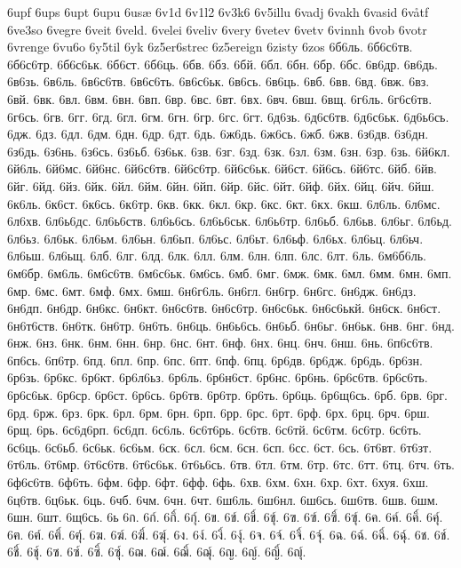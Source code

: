 6upf
6ups
6upt
6upu
6usæ
6v1d
6v1l2
6v3k6
6v5illu
6vadj
6vakh
6vasid
6våtf
6ve3so
6vegre
6veit
6veld.
6velei
6veliv
6very
6vetev
6vetv
6vinnh
6vob
6votr
6vrenge
6vu6o
6y5til
6yk
6z5er6strec
6z5ereign
6zisty
6zos
6б6ль.
6б6с6тв.
6б6с6тр.
6б6с6ьк.
6б6ст.
6б6ць.
6бв.
6бз.
6бй.
6бл.
6бн.
6бр.
6бс.
6в6др.
6в6дь.
6в6зь.
6в6ль.
6в6с6тв.
6в6с6ть.
6в6с6ьк.
6в6сь.
6в6ць.
6вб.
6вв.
6вд.
6вж.
6вз.
6вй.
6вк.
6вл.
6вм.
6вн.
6вп.
6вр.
6вс.
6вт.
6вх.
6вч.
6вш.
6вщ.
6г6ль.
6г6с6тв.
6г6сь.
6гв.
6гг.
6гд.
6гл.
6гм.
6гн.
6гр.
6гс.
6гт.
6д6зь.
6д6с6тв.
6д6с6ьк.
6д6ь6сь.
6дж.
6дз.
6дл.
6дм.
6дн.
6др.
6дт.
6дь.
6ж6дь.
6ж6сь.
6жб.
6жв.
6з6дв.
6з6дн.
6з6дь.
6з6нь.
6з6сь.
6з6ьб.
6з6ьк.
6зв.
6зг.
6зд.
6зк.
6зл.
6зм.
6зн.
6зр.
6зь.
6й6кл.
6й6ль.
6й6мс.
6й6нс.
6й6с6тв.
6й6с6тр.
6й6с6ьк.
6й6ст.
6й6сь.
6й6тс.
6йб.
6йв.
6йг.
6йд.
6йз.
6йк.
6йл.
6йм.
6йн.
6йп.
6йр.
6йс.
6йт.
6йф.
6йх.
6йц.
6йч.
6йш.
6к6ль.
6к6ст.
6к6сь.
6к6тр.
6кв.
6кк.
6кл.
6кр.
6кс.
6кт.
6кх.
6кш.
6л6ль.
6л6мс.
6л6хв.
6л6ь6дс.
6л6ь6ств.
6л6ь6сь.
6л6ь6ськ.
6л6ь6тр.
6л6ьб.
6л6ьв.
6л6ьг.
6л6ьд.
6л6ьз.
6л6ьк.
6л6ьм.
6л6ьн.
6л6ьп.
6л6ьс.
6л6ьт.
6л6ьф.
6л6ьх.
6л6ьц.
6л6ьч.
6л6ьш.
6л6ьщ.
6лб.
6лг.
6лд.
6лк.
6лл.
6лм.
6лн.
6лп.
6лс.
6лт.
6ль.
6м6б6ль.
6м6бр.
6м6ль.
6м6с6тв.
6м6с6ьк.
6м6сь.
6мб.
6мг.
6мж.
6мк.
6мл.
6мм.
6мн.
6мп.
6мр.
6мс.
6мт.
6мф.
6мх.
6мш.
6н6г6ль.
6н6гл.
6н6гр.
6н6гс.
6н6дж.
6н6дз.
6н6дп.
6н6др.
6н6кс.
6н6кт.
6н6с6тв.
6н6с6тр.
6н6с6ьк.
6н6с6ькй.
6н6ск.
6н6ст.
6н6т6ств.
6н6тк.
6н6тр.
6н6ть.
6н6ць.
6н6ь6сь.
6н6ьб.
6н6ьг.
6н6ьк.
6нв.
6нг.
6нд.
6нж.
6нз.
6нк.
6нм.
6нн.
6нр.
6нс.
6нт.
6нф.
6нх.
6нц.
6нч.
6нш.
6нь.
6п6с6тв.
6п6сь.
6п6тр.
6пд.
6пл.
6пр.
6пс.
6пт.
6пф.
6пц.
6р6дв.
6р6дж.
6р6дь.
6р6зн.
6р6зь.
6р6кс.
6р6кт.
6р6л6ьз.
6р6ль.
6р6н6ст.
6р6нс.
6р6нь.
6р6с6тв.
6р6с6ть.
6р6с6ьк.
6р6ср.
6р6ст.
6р6сь.
6р6тв.
6р6тр.
6р6ть.
6р6ць.
6р6щ6сь.
6рб.
6рв.
6рг.
6рд.
6рж.
6рз.
6рк.
6рл.
6рм.
6рн.
6рп.
6рр.
6рс.
6рт.
6рф.
6рх.
6рц.
6рч.
6рш.
6рщ.
6рь.
6с6д6рп.
6с6дп.
6с6ль.
6с6т6рь.
6с6тв.
6с6тй.
6с6тм.
6с6тр.
6с6ть.
6с6ць.
6с6ьб.
6с6ьк.
6с6ьм.
6ск.
6сл.
6см.
6сн.
6сп.
6сс.
6ст.
6сь.
6т6вт.
6т6зт.
6т6ль.
6т6мр.
6т6с6тв.
6т6с6ьк.
6т6ь6сь.
6тв.
6тл.
6тм.
6тр.
6тс.
6тт.
6тц.
6тч.
6ть.
6ф6с6тв.
6ф6ть.
6фм.
6фр.
6фт.
6фф.
6фь.
6хв.
6хм.
6хн.
6хр.
6хт.
6хуя.
6хш.
6ц6тв.
6ц6ьк.
6ць.
6чб.
6чм.
6чн.
6чт.
6ш6ль.
6ш6нл.
6ш6сь.
6ш6тв.
6шв.
6шм.
6шн.
6шт.
6щ6сь.
6ь
6ก.
6ก์.
6กิ์.
6กุ์.
6ข.
6ข์.
6ขิ์.
6ขุ์.
6ฃ.
6ฃ์.
6ฃิ์.
6ฃุ์.
6ค.
6ค์.
6คิ์.
6คุ์.
6ฅ.
6ฅ์.
6ฅิ์.
6ฅุ์.
6ฆ.
6ฆ์.
6ฆิ์.
6ฆุ์.
6ง.
6ง์.
6งิ์.
6งุ์.
6จ.
6จ์.
6จิ์.
6จุ์.
6ฉ.
6ฉ์.
6ฉิ์.
6ฉุ์.
6ช.
6ช์.
6ชิ์.
6ชุ์.
6ซ.
6ซ์.
6ซิ์.
6ซุ์.
6ฌ.
6ฌ์.
6ฌิ์.
6ฌุ์.
6ญ.
6ญ์.
6ญิ์.
6ญุ์.
